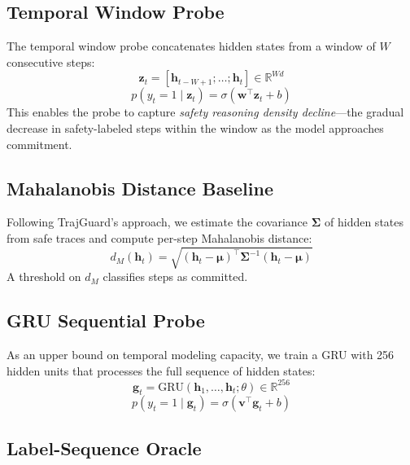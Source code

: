 \documentclass[11pt,a4paper]{article}
\begin{document}
\subsection{Temporal Window Probe}

The temporal window probe concatenates hidden states from a window of $W$ consecutive steps:
\begin{equation}
    \mathbf{z}_t = [\mathbf{h}_{t-W+1}; \ldots; \mathbf{h}_t] \in \mathbb{R}^{Wd}
\end{equation}
\begin{equation}
    p(y_t = 1 \mid \mathbf{z}_t) = \sigma(\mathbf{w}^\top \mathbf{z}_t + b)
\end{equation}
This enables the probe to capture \emph{safety reasoning density decline}---the gradual decrease in safety-labeled steps within the window as the model approaches commitment.

\subsection{Mahalanobis Distance Baseline}

Following TrajGuard's approach, we estimate the covariance $\mathbf{\Sigma}$ of hidden states from safe traces and compute per-step Mahalanobis distance:
\begin{equation}
    d_M(\mathbf{h}_t) = \sqrt{(\mathbf{h}_t - \boldsymbol{\mu})^\top \mathbf{\Sigma}^{-1} (\mathbf{h}_t - \boldsymbol{\mu})}
\end{equation}
A threshold on $d_M$ classifies steps as committed.

\subsection{GRU Sequential Probe}

As an upper bound on temporal modeling capacity, we train a GRU with 256 hidden units that processes the full sequence of hidden states:
\begin{equation}
    \mathbf{g}_t = \text{GRU}(\mathbf{h}_1, \ldots, \mathbf{h}_t; \theta) \in \mathbb{R}^{256}
\end{equation}
\begin{equation}
    p(y_t = 1 \mid \mathbf{g}_t) = \sigma(\mathbf{v}^\top \mathbf{g}_t + b)
\end{equation}

\subsection{Label-Sequence Oracle}
\end{document}
